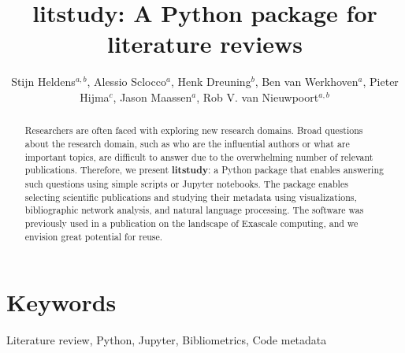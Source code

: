 \documentclass{article}
\title{litstudy: A Python package for literature reviews}
\author{Stijn Heldens$^{a,b}$, Alessio Sclocco$^{a}$, Henk Dreuning$^{b}$, Ben van Werkhoven$^{a}$, Pieter Hijma$^{c}$, Jason Maassen$^{a}$, Rob V. van Nieuwpoort$^{a,b}$}
\date{}
\begin{document}
\maketitle

\begin{abstract}
Researchers are often faced with exploring new research domains. Broad questions about the research domain, such as who are the influential authors or what are important topics, are difficult to answer due to the overwhelming number of relevant publications. Therefore, we present \textbf{litstudy}: a Python package that enables answering such questions using simple scripts or Jupyter notebooks. The package enables selecting scientific publications and studying their metadata using visualizations, bibliographic network analysis, and natural language processing. The software was previously used in a publication on the landscape of Exascale computing, and we envision great potential for reuse.
\end{abstract}

\section{Keywords}
Literature review, Python, Jupyter, Bibliometrics, Code metadata









\end{document}
